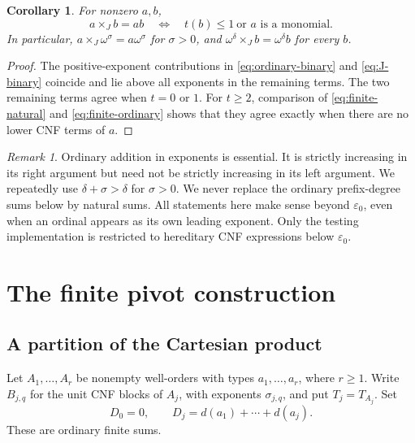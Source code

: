 \documentclass[11pt,letterpaper]{article}
\newtheorem{corollary}[theorem]{Corollary}
\theoremstyle{definition}
\theoremstyle{remark}
\newtheorem{remark}[theorem]{Remark}
\newcommand{\J}{\mathbin{\times_{\!J}}}
\newcommand{\ep}{\varepsilon_0}
\begin{document}
\begin{corollary}\label{cor:binary-equality}
For nonzero $a,b$,
\begin{equation}\label{eq:binary-equality}
 a\J b=ab
 \quad\Longleftrightarrow\quad
 t(b)\leq1\ \text{or $a$ is a monomial}.
\end{equation}
In particular, $a\J\omega^\sigma=a\omega^\sigma$ for $\sigma>0$,
and $\omega^\delta\J b=\omega^\delta b$ for every $b$.
\end{corollary}

\begin{proof}
The positive-exponent contributions in \eqref{eq:ordinary-binary} and
\eqref{eq:J-binary} coincide and lie above all exponents in the remaining
terms. The two remaining terms agree when $t=0$ or $1$. For $t\geq2$,
comparison of \eqref{eq:finite-natural} and \eqref{eq:finite-ordinary}
shows that they agree exactly when there are no lower CNF terms of $a$.
\end{proof}

\begin{remark}
Ordinary addition in exponents is essential. It is strictly increasing
in its right argument but need not be strictly increasing in its left
argument. We repeatedly use $\delta+\sigma>\delta$ for $\sigma>0$.
We never replace the ordinary prefix-degree sums below by natural sums.
All statements here make sense beyond $\ep$, even when an ordinal appears
as its own leading exponent. Only the testing implementation is restricted
to hereditary CNF expressions below $\ep$.
\end{remark}

\section{The finite pivot construction}\label{sec:finite}

\subsection{A partition of the Cartesian product}

Let $A_1,\ldots,A_r$ be nonempty well-orders with types
$a_1,\ldots,a_r$, where $r\geq1$. Write $B_{j,q}$ for the unit CNF blocks
of $A_j$, with exponents $\sigma_{j,q}$, and put $T_j=T_{A_j}$.
Set
\begin{equation}\label{eq:prefix-degree}
 D_0=0,\qquad D_j=d(a_1)+\cdots+d(a_j).
\end{equation}
These are ordinary finite sums.
\end{document}
